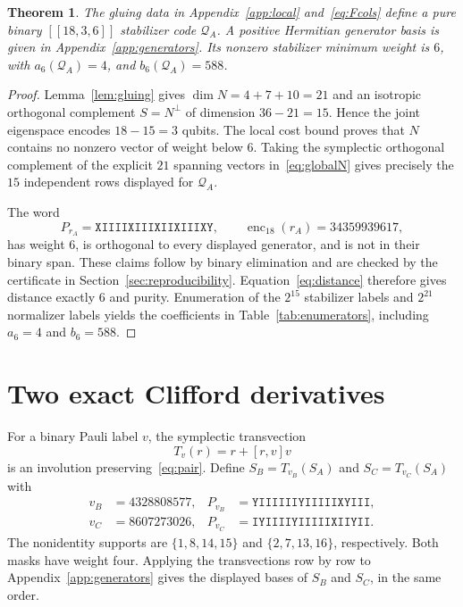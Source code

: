 \documentclass[11pt,a4paper]{article}
\newtheorem{theorem}{Theorem}
\newcommand{\CA}{\mathcal Q_A}
\newcommand{\pauli}[1]{\texttt{#1}}
\begin{document}
\begin{theorem}\label{thm:A}
The gluing data in Appendix~\ref{app:local} and~\eqref{eq:Fcols} define a pure binary $[[18,3,6]]$ stabilizer code $\CA$. A positive Hermitian generator basis is given in Appendix~\ref{app:generators}. Its nonzero stabilizer minimum weight is $6$, with $a_6(\CA)=4$, and $b_6(\CA)=588$.
\end{theorem}
\begin{proof}
Lemma~\ref{lem:gluing} gives $\dim N=4+7+10=21$ and an isotropic orthogonal complement $S=N^\perp$ of dimension $36-21=15$. Hence the joint eigenspace encodes $18-15=3$ qubits. The local cost bound proves that $N$ contains no nonzero vector of weight below $6$. Taking the symplectic orthogonal complement of the explicit $21$ spanning vectors in~\eqref{eq:globalN} gives precisely the $15$ independent rows displayed for $\CA$.

The word
\begin{equation}\label{eq:witnessA}
 P_{r_A}=\pauli{XIIIIXIIIXIIXIIIXY},\qquad
 \operatorname{enc}_{18}(r_A)=34359939617,
\end{equation}
has weight $6$, is orthogonal to every displayed generator, and is not in their binary span. These claims follow by binary elimination and are checked by the certificate in Section~\ref{sec:reproducibility}. Equation~\eqref{eq:distance} therefore gives distance exactly $6$ and purity. Enumeration of the $2^{15}$ stabilizer labels and $2^{21}$ normalizer labels yields the coefficients in Table~\ref{tab:enumerators}, including $a_6=4$ and $b_6=588$.
\end{proof}

\section{Two exact Clifford derivatives}\label{sec:derivatives}
For a binary Pauli label $v$, the symplectic transvection
\begin{equation}\label{eq:transvection}
 T_v(r)=r+[r,v]v
\end{equation}
is an involution preserving~\eqref{eq:pair}. Define $S_B=T_{v_B}(S_A)$ and $S_C=T_{v_C}(S_A)$ with
\begin{align}
 v_B&=4328808577,&P_{v_B}&=\pauli{YIIIIIIYIIIIIXYIII},\label{eq:vb}\\
 v_C&=8607273026,&P_{v_C}&=\pauli{IYIIIIYIIIIIXIIYII}.\label{eq:vc}
\end{align}
The nonidentity supports are $\{1,8,14,15\}$ and $\{2,7,13,16\}$, respectively. Both masks have weight four. Applying the transvections row by row to Appendix~\ref{app:generators} gives the displayed bases of $S_B$ and $S_C$, in the same order.
\end{document}
